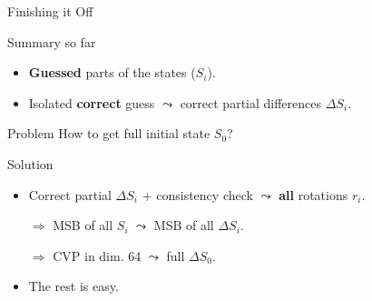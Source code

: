 



\begin{frame}[label=hard_finish]{Finishing it Off}

  \begin{block}{Summary so far}
    \begin{itemize}
    \item \textbf{Guessed} parts of the states ($S_i$).
    \item Isolated \textbf{correct} guess $\leadsto$ correct partial differences $\Delta S_i$.
    \end{itemize}
  \end{block}

  \bigskip

  \begin{alertblock}{Problem}
    How to get full initial state $S_0$?
  \end{alertblock}

  \bigskip
  \pause

  \begin{exampleblock}{Solution}
    \begin{itemize}
    \item Correct partial $\Delta S_i$ + consistency check $\leadsto$ \textbf{all} rotations $r_i$.
    \item[$\Rightarrow$] MSB of all $S_i$ $\leadsto$ MSB of all $\Delta S_i$.
    \item[$\Rightarrow$] CVP in dim. 64 $\leadsto$ full $\Delta S_0$.
    \item The rest is easy.
    \end{itemize}
  \end{exampleblock}
\end{frame}



